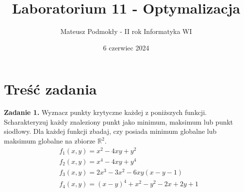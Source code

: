 \documentclass[11pt, leqno]{scrartcl}
\title{Laboratorium 11 - Optymalizacja}
\author{Mateusz Podmokły - II rok Informatyka WI}
\date{6 czerwiec 2024}
\begin{document}
    \maketitle
    \section{Treść zadania}
    \textbf{Zadanie 1.} Wyznacz punkty krytyczne każdej z poniższych
    funkcji. Scharakteryzuj każdy znaleziony punkt jako minimum,
    maksimum lub punkt siodłowy. Dla każdej funkcji zbadaj, czy
    posiada minimum globalne lub maksimum globalne na zbiorze
    $\mathbb{R}^2$.
    \begin{align*}
        &f_1(x,y)=x^2-4xy+y^2 \\
        &f_2(x,y)=x^4-4xy+y^4 \\
        &f_3(x,y)=2x^3-3x^2-6xy(x-y-1) \\
        &f_4(x,y)=(x-y)^4+x^2-y^2-2x+2y+1
    \end{align*}
\end{document}
